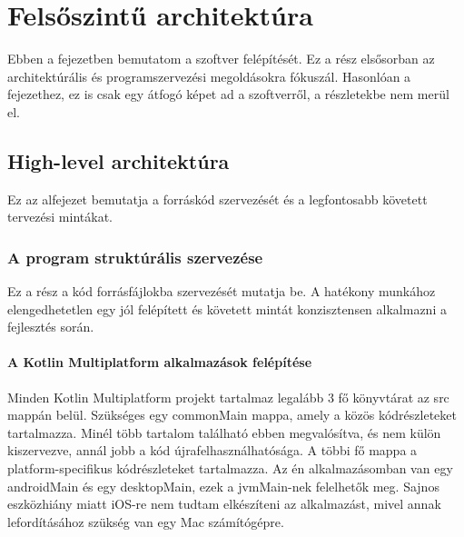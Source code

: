\chapter{Felsőszintű architektúra}
\label{sec:Architecture}

Ebben a fejezetben bemutatom a szoftver felépítését.  
Ez a rész elsősorban az architektúrális és programszervezési megoldásokra fókuszál.  
Hasonlóan a  fejezethez, ez is csak egy átfogó képet ad a szoftverről, a részletekbe nem merül el.

\section{High-level architektúra}
\label{sec:HighLevelArchitecture}

Ez az alfejezet bemutatja a forráskód szervezését és a legfontosabb követett tervezési mintákat.

\subsection{A program struktúrális szervezése}

Ez a rész a kód forrásfájlokba szervezését mutatja be.  
A hatékony munkához elengedhetetlen egy jól felépített és követett mintát konzisztensen alkalmazni a fejlesztés során.

\subsubsection{A Kotlin Multiplatform alkalmazások felépítése}

Minden Kotlin Multiplatform projekt tartalmaz legalább 3 fő könyvtárat az src mappán belül.  
Szükséges egy commonMain mappa, amely a közös kódrészleteket tartalmazza. Minél több tartalom található ebben megvalósítva, és nem külön kiszervezve, annál jobb a kód újrafelhasználhatósága.  
A többi fő mappa a platform-specifikus kódrészleteket tartalmazza. Az én alkalmazásomban van egy androidMain és egy desktopMain, ezek a jvmMain-nek felelhetők meg.  
Sajnos eszközhiány miatt iOS-re nem tudtam elkészíteni az alkalmazást, mivel annak lefordításához szükség van egy Mac számítógépre.

